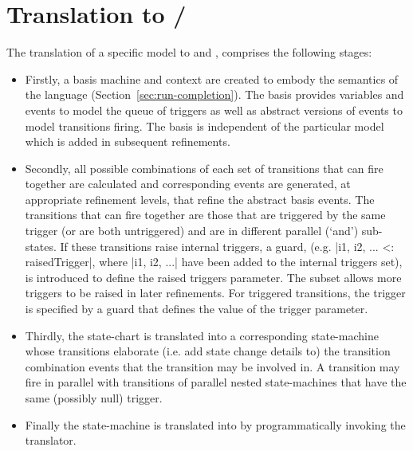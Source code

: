 
\section{\SCXML Translation to \UMLB/\EventB}
\label{sec:translation}
The translation of a specific \SCXML model to \UMLB and  \EventB, comprises the following stages: 
\begin{itemize}
	\item 
Firstly, a basis machine and context are created to embody the semantics of the \SCXML language (Section~\ref{sec:run-completion}).
The basis provides variables and events to model the queue of triggers as well as abstract versions of events to model transitions firing.
The basis is independent of the particular \SCXML model which is added in subsequent refinements.
	\item 
Secondly, all possible combinations of each set of transitions that can fire together are calculated and corresponding events are generated, at appropriate refinement levels, that refine the abstract basis events.
The transitions that can fire together are those that are triggered by the same trigger (or are both untriggered) and are in different parallel (`and') sub-states.
If these transitions raise internal triggers, a guard, (e.g. |{i1, i2, ...} <: raisedTrigger|, where |i1, i2, ...| have been added to the internal triggers set), is introduced to define the raised triggers parameter. 
The subset allows more triggers to be raised in later refinements.
For triggered transitions, the trigger is specified by a guard that defines the value of the trigger parameter. 
	\item 
Thirdly, the \SCXML state-chart is translated into a corresponding \UMLB state-machine whose transitions elaborate (i.e. add state change details to) the transition combination events that the transition may be involved in.
A transition may fire in parallel with transitions of parallel nested state-machines that have the same (possibly null) trigger.
	\item
Finally the \UMLB state-machine is translated into \EVENTB by programmatically invoking the \UMLB translator.
\end{itemize}


